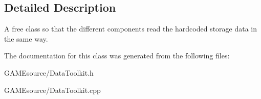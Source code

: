 \subsection{Detailed Description}
A free class so that the different components read the hardcoded storage data in the same way. 

The documentation for this class was generated from the following files\+:\begin{DoxyCompactItemize}
\item 
G\+A\+M\+Esource/Data\+Toolkit.\+h\item 
G\+A\+M\+Esource/Data\+Toolkit.\+cpp\end{DoxyCompactItemize}
